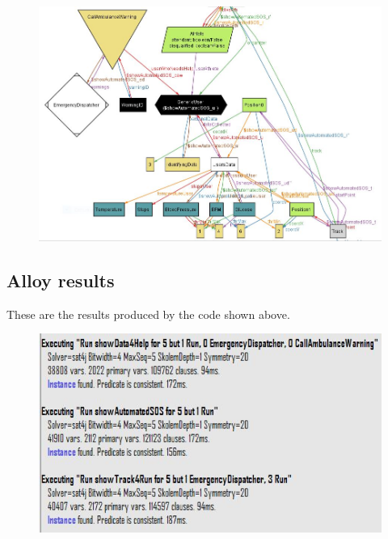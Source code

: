 \begin{figure}[h!] \ContinuedFloat
\centering
\includegraphics[scale=0.75]{sections/alloy_images/worldGenerated.JPG} \newline
{}
\end{figure}
\clearpage
\subsection{Alloy results}
These are the results produced by the code shown above.

\begin{figure}[h!] \ContinuedFloat
\centering
\includegraphics[scale=1]{sections/alloy_images/runResults.JPG} \newline
{}
\end{figure}

%